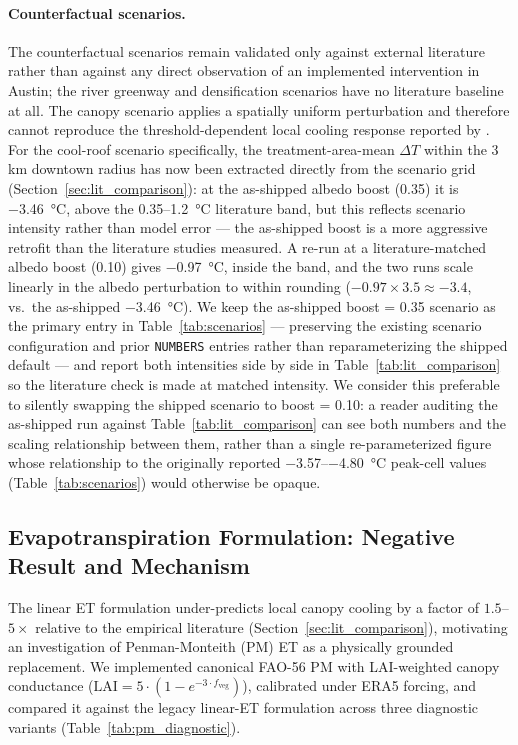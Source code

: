 \documentclass[12pt, letterpaper]{article}
\begin{document}
\paragraph{Counterfactual scenarios.}
The counterfactual scenarios remain validated only against external literature
rather than against any direct observation of an implemented intervention in
Austin; the river greenway and densification scenarios have no literature
baseline at all. The canopy scenario applies a spatially uniform perturbation
and therefore cannot reproduce the threshold-dependent local cooling response
reported by \citet{ziter2019scale}. For the cool-roof scenario specifically,
the treatment-area-mean $\Delta T$ within the 3\,km downtown radius has now
been extracted directly from the scenario grid (Section~\ref{sec:lit_comparison}):
at the as-shipped albedo boost (0.35) it is \SI{-3.46}{\degreeCelsius}, above
the \SI{0.35}{}--\SI{1.2}{\degreeCelsius} literature band, but this reflects
scenario intensity rather than model error — the as-shipped boost is a more
aggressive retrofit than the literature studies measured. A re-run at a
literature-matched albedo boost (0.10) gives \SI{-0.97}{\degreeCelsius},
inside the band, and the two runs scale linearly in the albedo perturbation
to within rounding ($-0.97 \times 3.5 \approx -3.4$, vs.\ the as-shipped
\SI{-3.46}{\degreeCelsius}). We keep the as-shipped boost = 0.35 scenario as
the primary entry in Table~\ref{tab:scenarios} — preserving the existing
scenario configuration and prior \texttt{NUMBERS} entries rather than
reparameterizing the shipped default — and report both intensities side by
side in Table~\ref{tab:lit_comparison} so the literature check is made at
matched intensity. We consider this preferable to silently swapping the
shipped scenario to boost = 0.10: a reader auditing the as-shipped run
against Table~\ref{tab:lit_comparison} can see both numbers and the scaling
relationship between them, rather than a single re-parameterized figure
whose relationship to the originally reported \SI{-3.57}{}--\SI{-4.80}{\degreeCelsius}
peak-cell values (Table~\ref{tab:scenarios}) would otherwise be opaque.

\subsection{Evapotranspiration Formulation: Negative Result and Mechanism}
\label{sec:pm_negative}

The linear ET formulation under-predicts local canopy cooling by a factor
of $1.5$--$5\times$ relative to the empirical literature
(Section~\ref{sec:lit_comparison}), motivating an investigation of
Penman-Monteith (PM) ET as a physically grounded replacement. We implemented
canonical FAO-56 PM with LAI-weighted canopy conductance
($\mathrm{LAI} = 5 \cdot (1 - e^{-3 \cdot f_{\mathrm{veg}}})$),
calibrated under ERA5 forcing, and compared it against the legacy linear-ET
formulation across three diagnostic variants (Table~\ref{tab:pm_diagnostic}).
\end{document}
